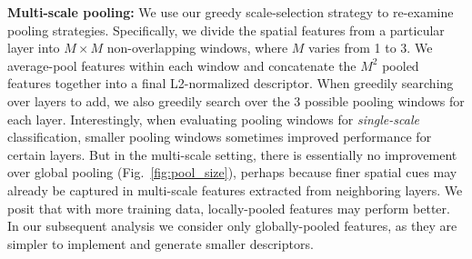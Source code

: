 \documentclass[10pt,twocolumn,letterpaper]{article}
\begin{document}
{\bf Multi-scale pooling:} We use our greedy scale-selection strategy to re-examine pooling strategies. Specifically, we divide the spatial features from a particular layer into $M \times M$ non-overlapping windows, where $M$ varies from 1 to 3. We average-pool features within each window and concatenate the $M^2$ pooled features together into a final L2-normalized descriptor. When greedily searching over layers to add, we also greedily search over the 3 possible pooling windows for each layer. Interestingly, when evaluating pooling windows for {\em single-scale} classification, smaller pooling windows sometimes improved performance for certain layers. But in the multi-scale setting, there is essentially no improvement over global pooling (Fig.~\ref{fig:pool_size}), perhaps because finer spatial cues may already be captured in multi-scale features extracted from neighboring layers. We posit that with more training data, locally-pooled features may perform better. %
In our subsequent analysis we consider only globally-pooled features, as they are simpler to implement and generate smaller descriptors.
\end{document}
